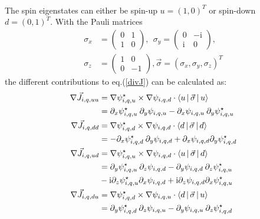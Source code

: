 \documentclass[3p]{elsarticle}
\begin{document}
\begin{itemize}
\begin{align}
\end{align}
The spin eigenstates can either be spin-up $u = (1,0)^T$ or spin-down $d = (0,1)^T$. With the Pauli matrices
\begin{align}
\sigma_x & =  \begin{pmatrix} 0 & 1  \\ 1 & 0 \end{pmatrix}, \: \: \sigma_y =  \begin{pmatrix} 0 & -\mathrm{i}  \\ \mathrm{i} & 0 \end{pmatrix}, \nonumber\\ 
\sigma_z &=  \begin{pmatrix} 1 & 0  \\ 0 & -1 \end{pmatrix}, \vec{\sigma}  = (\sigma_x, \sigma_y, \sigma_z)^T \nonumber
\end{align}
 the different contributions to eq.(\ref{divJ}) can be calculated as:
\begin{align}
 \nabla \vec{J}_{i,q,uu}  &=  \nabla \psi_{i,q,u}^\star \times \nabla \psi_{i,q,d} \cdot \Braket{ u  | \vec{\sigma} | u } \\
&=   \partial_x \psi_{i,q,u}^\star \: \partial_y \psi_{i,q,u} - \partial_x \psi_{i,q,u} \: \partial_y \psi_{i,q,u}^\star  \label{12terms_i}\nonumber\\
\nabla \vec{J}_{i,q,dd} &= \nabla \psi_{i,q,d}^\star \times \nabla \psi_{i,q,d} \cdot \Braket{ d  | \vec{\sigma} | d } \\
& =  - \partial_x \psi_{i,q,d}^\star \: \partial_y \psi_{i,q,d} + \partial_x \psi_{i,q,d} \partial_y \psi_{i,q,d}^\star \nonumber\\
 \nabla \vec{J}_{i,q,ud} &= \nabla \psi_{i,q,u}^\star \times \nabla \psi_{i,q,d} \cdot \Braket{ u  | \vec{\sigma} | d } \\
&=  \partial_y \psi_{i,q,u}^\star \: \partial_z \psi_{i,q,d} - \partial_y \psi_{i,q,d} \: \partial_z \psi_{i,q,u}^\star  \nonumber\\
& - \mathrm{i} \partial_z  \psi_{i,q,u}^\star \partial_x \psi_{i,q,d} + \mathrm{i} \partial_z \psi_{i,q,d}  \partial_x  \psi_{i,q,u}^\star \nonumber\\
 \nabla \vec{J}_{i,q,du} &= \nabla \psi_{i,q,d}^\star \times \nabla \psi_{i,q,u} \cdot \Braket{ d  | \vec{\sigma} | u } \\
&=  \partial_y \psi_{i,q,d}^\star \: \partial_z \psi_{i,q,u} -  \partial_y \psi_{i,q,u} \: \partial_z \psi_{i,q,d}^\star \nonumber\\ 

\end{align}
\end{itemize}
\end{document}
